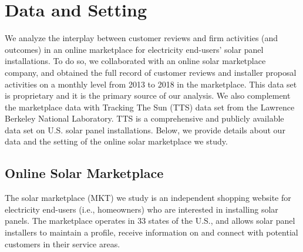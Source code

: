 \documentclass[msom,blindrev]{informs3}
\begin{document}
\section{Data and Setting}

We analyze the interplay between customer reviews and firm activities (and outcomes) in an online marketplace for electricity end-users' solar panel installations. To do so, we collaborated with an online solar marketplace company, and obtained the full record of customer reviews and installer proposal activities on a monthly level from 2013 to 2018 in the marketplace. This data set is proprietary and it is the primary source of our analysis. We also complement the marketplace data with Tracking The Sun (TTS) data set from the Lawrence Berkeley National Laboratory. TTS is a comprehensive and publicly available data set on U.S. solar panel installations. Below, we provide details about our data and the setting of the online solar marketplace we study.



\subsection{Online Solar Marketplace}

The solar marketplace (MKT) we study is an independent shopping website for electricity end-users (i.e., homeowners) who are interested in installing solar panels.  The marketplace operates in 33 states of the U.S., and allows solar panel installers to maintain a profile, receive information on and connect with potential customers in their service areas.
\end{document}
